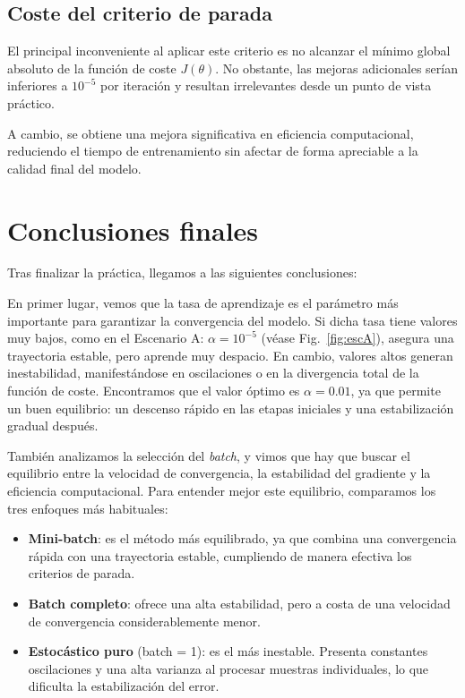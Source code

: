 \subsection{Coste del criterio de parada}

El principal inconveniente al aplicar este criterio es no alcanzar el mínimo global absoluto de la función de coste $J(\theta)$. No obstante, las mejoras adicionales serían inferiores a $10^{-5}$ por iteración y resultan irrelevantes desde un punto de vista práctico.

A cambio, se obtiene una mejora significativa en eficiencia computacional, reduciendo el tiempo de entrenamiento sin afectar de
forma apreciable a la calidad final del modelo.

\section{Conclusiones finales}

Tras finalizar la práctica, llegamos a las siguientes conclusiones:

En primer lugar, vemos que la tasa de aprendizaje es el parámetro más importante para garantizar la convergencia del modelo. Si dicha tasa tiene valores muy bajos, como en el Escenario A: $\alpha = 10^{-5}$ (véase Fig.~\ref{fig:escA}), asegura una trayectoria estable, pero aprende muy despacio. En cambio, valores altos generan inestabilidad, manifestándose en oscilaciones o en la divergencia total de la función de coste. Encontramos que el valor óptimo es $\alpha = 0.01$, ya que permite un buen equilibrio: un descenso rápido en las etapas iniciales y una estabilización gradual después.

También analizamos la selección del \textit{batch}, y vimos que hay que buscar el equilibrio entre la velocidad de convergencia, la estabilidad del gradiente y la eficiencia computacional. Para entender mejor este equilibrio, comparamos los tres enfoques más habituales:

\begin{itemize}
    \item \textbf{Mini-batch}: es el método más equilibrado, ya que combina una convergencia rápida con una trayectoria estable, cumpliendo de manera efectiva los criterios de parada.
    \item \textbf{Batch completo}: ofrece una alta estabilidad, pero a costa de una velocidad de convergencia considerablemente menor.
    \item \textbf{Estocástico puro} (batch = 1): es el más inestable. Presenta constantes oscilaciones y una alta varianza al procesar muestras individuales, lo que dificulta la estabilización del error.
\end{itemize}

